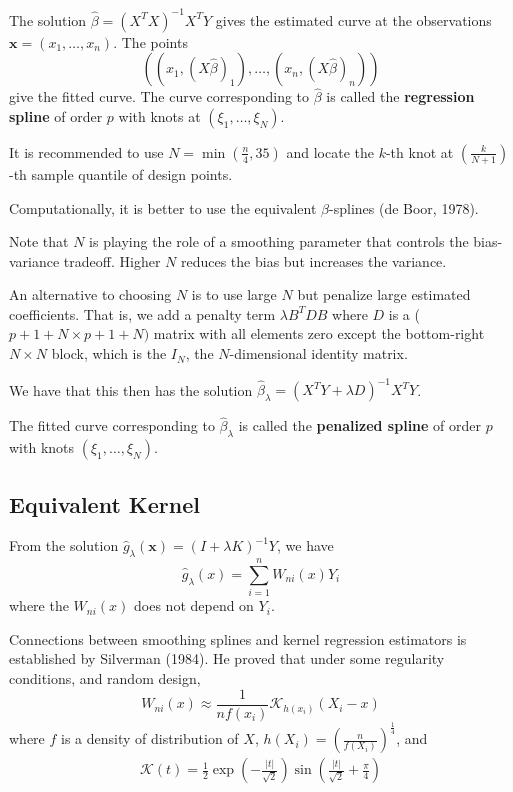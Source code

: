 The solution $\hat \beta = (X^{T} X)^{-1} X^{T} Y$ gives the estimated
curve at the observations $\mathbf{x} = (x_{1}, \dots, x_{n})$.  The
points
\begin{equation}
  \label{eq:85}
  ((x_{1}, (X \hat \beta)_{1}), \dots, (x_{n}, (X \hat \beta)_{n}))
\end{equation} give the fitted curve.  The curve corresponding to
$\hat \beta$ is called the \textbf{regression spline} of order $p$
with knots at $(\xi_{1}, \dots, \xi_{N})$.

It is recommended to use $N = \min(\frac{n}{4}, 35)$ and locate the
$k$-th knot at $(\frac{k}{N+1})$-th sample quantile of design points.

Computationally, it is better to use the equivalent $\beta$-splines
(de Boor, 1978).

Note that $N$ is playing the role of a smoothing parameter that
controls the bias-variance tradeoff. Higher $N$ reduces the bias but
increases the variance.

An alternative to choosing $N$ is to use large $N$ but penalize large
estimated coefficients.  That is, we add a penalty term $\lambda B^{T}
D B$ where $D$ is a ($p+1 + N \times p+1+N)$ matrix with all elements
zero except the bottom-right $N \times N$ block, which is the $I_{N}$,
the $N$-dimensional identity matrix.

We have that this then has the solution $\hat \beta_{\lambda} = (X^{T}
Y + \lambda D)^{-1} X^{T} Y$.

The fitted curve corresponding to $\hat \beta_{\lambda}$ is called the
\textbf{penalized spline} of order $p$ with knots $(\xi_{1}, \dots,
\xi_{N})$.


\subsection{Equivalent Kernel}
\label{sec:equivalent-kernel}

From the solution $\hat g_{\lambda}(\mathbf{x}) = (I + \lambda K)^{-1}
Y$, we have
\begin{equation}
  \label{eq:86}
  \hat g_{\lambda}(x) = \sum_{i=1}^{n} W_{ni}(x) Y_{i}
\end{equation} where the $W_{ni}(x)$ does not depend on $Y_{i}$.

Connections between smoothing splines and kernel regression estimators
is established by Silverman (1984).  He proved that under some
regularity conditions, and random design,
\begin{equation}
  \label{eq:87}
  W_{ni}(x) \approx \frac{1}{nf(x_{i})}  \mathcal{K}_{h(x_{i})}(X_{i}
  - x)
\end{equation} where $f$ is a density of distribution of $X$,
$h(X_{i}) = (\frac{n}{f(X_{i})})^{\frac{1}{4}}$, and
\begin{align}
  \label{eq:88}
  \mathcal{K}(t) = \frac{1}{2}  \exp(-\frac{|t|}{\sqrt{2}}) \sin
  (\frac{|t|}{\sqrt{2}} + \frac{\pi}{4})
\end{align}

